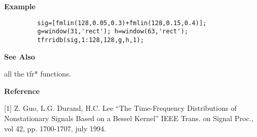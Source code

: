 \newpage

{\bf \large \sf Example}
\begin{verbatim}
         sig=[fmlin(128,0.05,0.3)+fmlin(128,0.15,0.4)];  
         g=window(31,'rect'); h=window(63,'rect');  
         tfrridb(sig,1:128,128,g,h,1);
\end{verbatim}
\vspace*{.5cm}

{\bf \large \sf See Also}\\
\hspace*{1.5cm}
\begin{minipage}[t]{13.5cm}
all the {\ty tfr*} functions.
\end{minipage}
\vspace*{.5cm}


{\bf \large \sf Reference}\\
\hspace*{1.5cm}
\begin{minipage}[t]{13.5cm}
[1] Z. Guo, L.G. Durand, H.C. Lee ``The Time-Frequency Distributions of
Nonstationary Signals Based on a Bessel Kernel'' IEEE Trans. on Signal
Proc., vol 42, pp. 1700-1707, july 1994.
\end{minipage}

